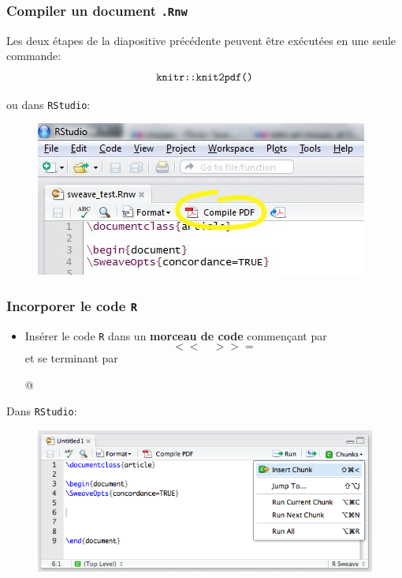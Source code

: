 \documentclass[10pt]{beamer}\usepackage[]{graphicx}\usepackage[]{color}
\begin{document}
\begin{frame}\frametitle{Compiler un document \texttt{.Rnw}}

\begin{block}{Les deux étapes de la diapositive précédente peuvent être exécutées en une seule commande:}
\[ \textrm{\texttt{knitr::knit2pdf()}} \]
\end{block}

ou dans \texttt{RStudio}:
\begin{figure}[h!]
\centering
\includegraphics[scale=0.5, keepaspectratio]{./Compile-pdf.jpg}
\end{figure}
\end{frame}

\begin{frame}\frametitle{Incorporer le code \texttt{R}}

\begin{itemize}
\item Insérer le code \texttt{R} dans un \textbf{morceau de code} commençant par $$ << \quad >>= $$
et se terminant par
\begin{center}
{@}
\end{center}
\end{itemize}

Dans \texttt{RStudio}:
\begin{figure}[h!]
\centering
\includegraphics[scale=0.35, keepaspectratio]{./sweave_chunk}
\end{figure}
\end{frame}
\end{document}
